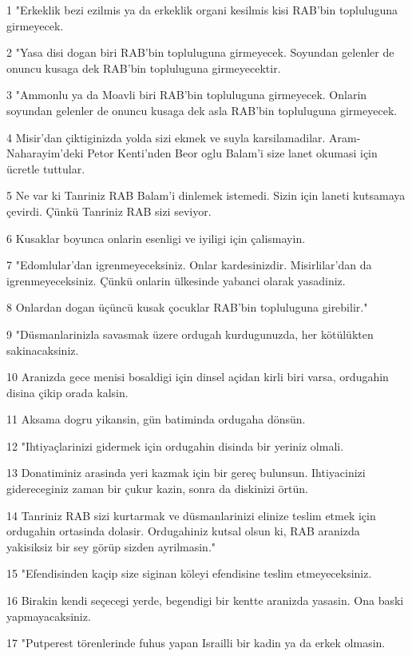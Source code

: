 \par 1 "Erkeklik bezi ezilmis ya da erkeklik organi kesilmis kisi RAB'bin topluluguna girmeyecek.
\par 2 "Yasa disi dogan biri RAB'bin topluluguna girmeyecek. Soyundan gelenler de onuncu kusaga dek RAB'bin topluluguna girmeyecektir.
\par 3 "Ammonlu ya da Moavli biri RAB'bin topluluguna girmeyecek. Onlarin soyundan gelenler de onuncu kusaga dek asla RAB'bin topluluguna girmeyecek.
\par 4 Misir'dan çiktiginizda yolda sizi ekmek ve suyla karsilamadilar. Aram-Naharayim'deki Petor Kenti'nden Beor oglu Balam'i size lanet okumasi için ücretle tuttular.
\par 5 Ne var ki Tanriniz RAB Balam'i dinlemek istemedi. Sizin için laneti kutsamaya çevirdi. Çünkü Tanriniz RAB sizi seviyor.
\par 6 Kusaklar boyunca onlarin esenligi ve iyiligi için çalismayin.
\par 7 "Edomlular'dan igrenmeyeceksiniz. Onlar kardesinizdir. Misirlilar'dan da igrenmeyeceksiniz. Çünkü onlarin ülkesinde yabanci olarak yasadiniz.
\par 8 Onlardan dogan üçüncü kusak çocuklar RAB'bin topluluguna girebilir."
\par 9 "Düsmanlarinizla savasmak üzere ordugah kurdugunuzda, her kötülükten sakinacaksiniz.
\par 10 Aranizda gece menisi bosaldigi için dinsel açidan kirli biri varsa, ordugahin disina çikip orada kalsin.
\par 11 Aksama dogru yikansin, gün batiminda ordugaha dönsün.
\par 12 "Ihtiyaçlarinizi gidermek için ordugahin disinda bir yeriniz olmali.
\par 13 Donatiminiz arasinda yeri kazmak için bir gereç bulunsun. Ihtiyacinizi gidereceginiz zaman bir çukur kazin, sonra da diskinizi örtün.
\par 14 Tanriniz RAB sizi kurtarmak ve düsmanlarinizi elinize teslim etmek için ordugahin ortasinda dolasir. Ordugahiniz kutsal olsun ki, RAB aranizda yakisiksiz bir sey görüp sizden ayrilmasin."
\par 15 "Efendisinden kaçip size siginan köleyi efendisine teslim etmeyeceksiniz.
\par 16 Birakin kendi seçecegi yerde, begendigi bir kentte aranizda yasasin. Ona baski yapmayacaksiniz.
\par 17 "Putperest törenlerinde fuhus yapan Israilli bir kadin ya da erkek olmasin.
